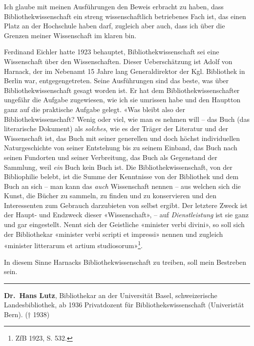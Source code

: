 \documentclass[a4paper,
fontsize=11pt,
oneside,
numbers=noperiodatend,
parskip=half-,
bibliography=totoc,
final
]{scrartcl}
\begin{document}
Ich glaube mit meinen Ausführungen den Beweis erbracht zu haben, dass
Bibliothekwissenschaft ein streng wissenschaftlich betriebenes Fach ist,
das einen Platz an der Hochschule haben darf, zugleich aber auch, dass
ich über die Grenzen meiner Wissenschaft im klaren bin.

Ferdinand Eichler hatte 1923 behauptet, Bibliothekwissenschaft sei eine
Wissenschaft über den Wissenschaften. Dieser Ueberschätzung ist Adolf
von Harnack, der im Nebenamt 15 Jahre lang Generaldirektor der Kgl.
Bibliothek in Berlin war, entgegengetreten. Seine Ausführungen sind das
beste, was über Bibliothekwissenschaft gesagt worden ist. Er hat dem
Bibliothekwissenschafter ungefähr die Aufgabe zugewiesen, wie ich sie
umrissen habe und den Hauptton ganz auf die praktische Aufgabe gelegt.
«Was bleibt also der Bibliothekwissenschaft? Wenig oder viel, wie man es
nehmen will -- das Buch (das literarische Dokument) als \emph{solches},
wie es der Träger der Literatur und der Wissenschaft ist, das Buch mit
seiner generellen und doch höchst individuellen Naturgeschichte von
seiner Entstehung bis zu seinem Einband, das Buch nach seinen Fundorten
und seiner Verbreitung, das Buch als Gegenstand der Sammlung, weil
\emph{ein} Buch kein Buch ist. Die Bibliothekwissenschaft, von der
Bibliophilie belebt, ist die Summe der Kenntnisse von der Bibliothek und
dem Buch an sich -- man kann das \emph{auch} Wissenschaft nennen -- aus
welchen sich die Kunst, die Bücher zu sammeln, zu finden und zu
konservieren und den Interessenten zum Gebrauch darzubieten von selbst
ergibt. Der letztere Zweck ist der Haupt- und Endzweck dieser
«Wissenschaft», -- auf \emph{Dienstleistung} ist sie ganz und gar
eingestellt. Nennt sich der Geistliche «minister verbi divini», so soll
sich der Bibliothekar «minister verbi scripti et impressi» nennen und
zugleich «minister litterarum et artium studiosorum»\footnote{ZfB 1923,
  S. 532.}.

In diesem Sinne Harnacks Bibliothekwissenschaft zu treiben, soll mein
Bestreben sein.

\begin{center}\rule{0.5\linewidth}{\linethickness}\end{center}

\textbf{Dr.~Hans Lutz}, Bibliothekar an der Universität Basel,
schweizerische Landesbibliothek, ab 1936 Privatdozent für
Bibliothekswissenschaft (Univeristät Bern). († 1938)
\end{document}
